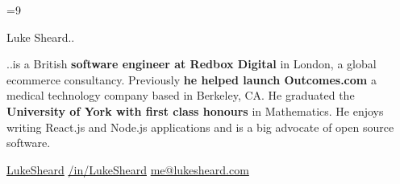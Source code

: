 \documentclass{article}
\begin{document}
\color{body}

=9\relax     %

\raggedright

\fontsize{10pt}{12pt}\selectfont


\begin{minipage}[t]{\textwidth}
  {\Huge
    Luke Sheard..
  }

  {\vspace{10pt}
    ..is a British \textbf{software engineer at Redbox Digital} in London, a global ecommerce consultancy. Previously \textbf{he helped launch Outcomes.com} a medical technology company based in Berkeley, CA. He graduated the \textbf{University of York with first class honours} in Mathematics. He enjoys writing React.js and Node.js applications and is a big advocate of open source software.
  }

  \vspace{5pt}

  \faGithub
  \hspace{3pt}
  \href{https://www.github.com/LukeSheard}{LukeSheard}
  \hspace{20pt}
  \faLinkedin
  \hspace{3pt}
  \href{http://www.linkedin.com/in/lukesheard}{/in/LukeSheard}
  \hspace{20pt}
  \faEnvelope
  \hspace{3pt}
  \href{mailto:me@lukesheard.com}{me@lukesheard.com}

  \vspace{20pt}
\end{minipage}
\end{document}
